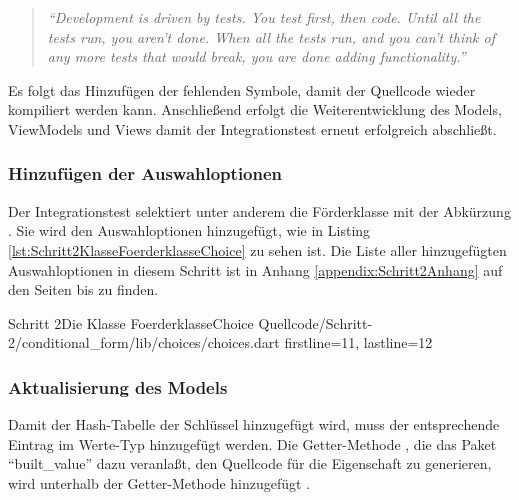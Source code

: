 \begin{quotation}
\textit{\enquote{Development is driven by tests.
You test first, then code.
Until all the tests run, you aren't
done.
When all the tests run, and you can't think of any more tests that would break, you
are done adding functionality.}}


\end{quotation}

Es folgt das Hinzufügen der fehlenden Symbole, damit der Quellcode wieder kompiliert werden kann.
Anschließend erfolgt die Weiterentwicklung des Models, ViewModels und Views damit der Integrationstest erneut erfolgreich abschließt.


\subsubsection{Hinzufügen der Auswahloptionen}

Der Integrationstest selektiert unter anderem die Förderklasse mit der Abkürzung . Sie wird den Auswahloptionen hinzugefügt, wie in Listing \ref{lst:Schritt2KlasseFoerderklasseChoice} zu sehen ist.
Die Liste aller hinzugefügten Auswahloptionen in diesem Schritt ist in Anhang \ref{appendix:Schritt2Anhang} auf den Seiten \pageref{lst:Schritt2FoerderklasseChoicesKategorieChoices} bis \pageref{lst:Schritt2hauptzielsetzungLandChoices} zu finden.

\begin{alexlisting}{Schritt 2}{Die Klasse FoerderklasseChoice}
  {Quellcode/Schritt-2/conditional_form/lib/choices/choices.dart}
  {firstline=11, lastline=12}
  \label{lst:Schritt2KlasseFoerderklasseChoice}
\end{alexlisting}

\subsubsection{Aktualisierung des Models}

Damit der Hash-Tabelle der Schlüssel  hinzugefügt wird, muss der entsprechende Eintrag im Werte-Typ  hinzugefügt werden.
Die Getter-Methode , die das Paket \enquote{built_value} dazu veranlaßt, den Quellcode für die Eigenschaft zu generieren, wird unterhalb der Getter-Methode  hinzugefügt .

